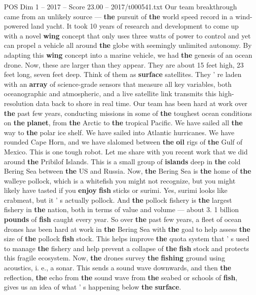 \begin{textsample}{POS Dim 1 – 2017 – Score 23.00 – 2017/t000541.txt}
Our team breakthrough came from an unlikely source — \textbf{the} pursuit of \textbf{the} world speed record in a wind-powered land yacht.
It took 10 years of research and development to come up with a novel \textbf{wing} concept that only uses three watts of power to control and yet can propel a vehicle all around \textbf{the} globe with seemingly unlimited autonomy.
By adapting this \textbf{wing} concept into a marine vehicle, we had \textbf{the} genesis of an ocean drone.
Now, these are larger than they appear.
They are about 15 feet high, 23 feet long, seven feet deep.
Think of them as \textbf{surface} satellites.
They ' re laden with an \textbf{array} of science-grade sensors that measure all key variables, both oceanographic and atmospheric, and a live satellite link transmits this high- resolution data back to shore in real time.
Our team has been hard at work over \textbf{the} past few years, conducting missions in some of \textbf{the} toughest ocean conditions on \textbf{the} \textbf{planet}, from \textbf{the} Arctic to \textbf{the} tropical Pacific.
We have sailed all \textbf{the} way to \textbf{the} polar ice shelf.
We have sailed into Atlantic hurricanes.
We have rounded Cape Horn, and we have slalomed between \textbf{the} \textbf{oil} rigs of \textbf{the} Gulf of Mexico.
This is one tough robot.
Let me share with you recent work that we did around \textbf{the} Pribilof Islands.
This is a small group of \textbf{islands} deep in \textbf{the} cold Bering Sea between \textbf{the} US and Russia.
Now, \textbf{the} Bering Sea is \textbf{the} home of \textbf{the} walleye pollock, which is a whitefish you might not recognize, but you might likely have tasted if you \textbf{enjoy} \textbf{fish} sticks or surimi.
Yes, surimi looks like crabmeat, but it ' s actually pollock.
And \textbf{the} pollock fishery is \textbf{the} largest fishery in \textbf{the} nation, both in terms of value and volume — about 3. 1 billion \textbf{pounds} of \textbf{fish} caught every year.
So over \textbf{the} past few years, a fleet of ocean drones has been hard at work in \textbf{the} Bering Sea with \textbf{the} goal to help assess \textbf{the} size of \textbf{the} pollock \textbf{fish} stock.
This helps improve \textbf{the} quota system that ' s used to manage \textbf{the} fishery and help prevent a collapse of \textbf{the} \textbf{fish} stock and protects this fragile ecosystem.
Now, \textbf{the} drones survey \textbf{the} \textbf{fishing} ground using acoustics, i. e., a sonar.
This sends a sound wave downwards, and then \textbf{the} reflection, \textbf{the} echo from \textbf{the} sound wave from \textbf{the} seabed or schools of \textbf{fish}, gives us an idea of what ' s happening below \textbf{the} \textbf{surface}.

\end{textsample}
